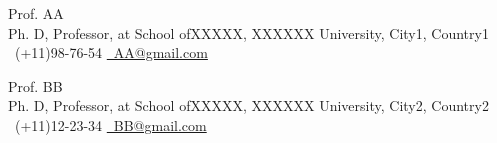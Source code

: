 
\begin{cventries}
  \cventry
    {} %
    {} %
    {} %
    {} %
    {
    	 \vspace{-4.0mm}         
      \begin{cvitems} %
  \item { Prof. AA\\
        Ph. D, Professor,  at School ofXXXXX, XXXXXX University,
City1, Country1\\ 
\faPhone \ (+11)98-76-54 \quad   \href{mailto:AA@gmail.com}{\faEnvelope \ AA@gmail.com} 
}
  \item { Prof. BB\\
	Ph. D, Professor,  at School ofXXXXX, XXXXXX University,
	City2, Country2\\ 
	\faPhone \ (+11)12-23-34 \quad   \href{mailto:BB@gmail.com}{\faEnvelope \ BB@gmail.com} 
}
      \end{cvitems}
    }

\end{cventries}
